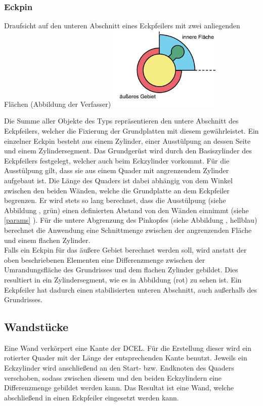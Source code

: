\subsubsection{Eckpin}
\label{Eckpin}

\begin{Bild}{Draufsicht auf den unteren Abschnitt eines Eckpfeilers mit zwei anliegenden Flächen (Abbildung der Verfasser)}
	\includegraphics[height=150px]{Bilder/CornerPin2D-07.png}
\end{Bild}

Die Summe aller Objekte des Typs  repräsentieren den untere Abschnitt des Eckpfeilers, welcher die Fixierung der Grundplatten mit diesem gewährleistet.
Ein einzelner Eckpin besteht aus einem Zylinder, einer Ausstülpung an dessen Seite und einem Zylindersegment.
Das Grundgerüst wird durch den Basiszylinder des Eckpfeilers festgelegt, welcher auch beim Eckzylinder vorkommt.
Für die Ausstülpung gilt, dass sie aus einem Quader mit angrenzendem Zylinder aufgebaut ist.
Die Länge des Quaders ist dabei abhängig von dem Winkel zwischen den beiden Wänden, welche die Grundplatte an dem Eckpfeiler begrenzen.
Er wird stets so lang berechnet, dass die Ausstülpung (siehe Abbildung \thebildnr, grün) einen definierten Abstand von den Wänden einnimmt (siehe \ref{params} ).
Für die untere Abgrenzung des Pinkopfes (siehe Abbildung \thebildnr, hellblau) berechnet die Anwendung eine Schnittmenge zwischen der angrenzenden Fläche und einem flachen Zylinder.\\
Falls ein Eckpin für das äußere Gebiet berechnet werden soll, wird anstatt der oben beschriebenen Elementen eine Differenzmenge zwischen der Umrandungsfläche des Grundrisses und dem flachen Zylinder gebildet.
Dies resultiert in ein Zylindersegment, wie es in Abbildung \thebildnr (rot) zu sehen ist.
Ein Eckpfeiler hat dadurch einen stabilisierten unteren Abschnitt, auch außerhalb des Grundrisses.


\subsection{Wandstücke}
Eine Wand verkörpert eine Kante der DCEL.
Für die Erstellung dieser wird ein rotierter Quader mit der Länge der entsprechenden Kante benutzt.
Jeweils ein Eckzylinder wird anschließend an den Start- bzw. Endknoten des Quaders verschoben, sodass zwischen diesem und den beiden Eckzylindern eine Differenzmenge gebildet werden kann.
Das Resultat ist eine Wand, welche abschließend in einen Eckpfeiler eingesetzt werden kann. 

